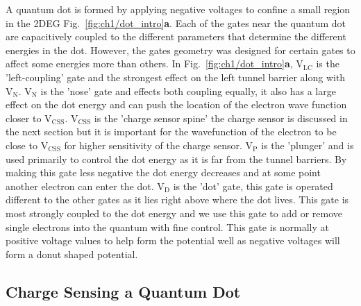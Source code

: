 A quantum dot is formed by applying negative voltages to confine a small region in the 2DEG Fig.~\ref{fig:ch1/dot_intro}\textbf{a}.
Each of the gates near the quantum dot are capacitively coupled to the different parameters that determine the different energies in the dot. However, the gates geometry was designed for certain gates to affect some energies more than others. In Fig.~\ref{fig:ch1/dot_intro}\textbf{a}, $\mathrm{V_{LC}}$ is the 'left-coupling' gate and the strongest effect on the left tunnel barrier along with $\mathrm{V_{N}}$. $\mathrm{V_{N}}$ is the 'nose' gate and effects both coupling equally, it also has a large effect on the dot energy and can push the location of the electron wave function closer to $\mathrm{V_{CSS}}$. $\mathrm{V_{CSS}}$ is the 'charge sensor spine' the charge sensor is discussed in the next section but it is important for the wavefunction of the electron to be close to $\mathrm{V_{CSS}}$ for higher sensitivity of the charge sensor. $\mathrm{V_{P}}$ is the 'plunger' and is used primarily to control the dot energy as it is far from the tunnel barriers. By making this gate less negative the dot energy decreases and at some point another electron can enter the dot. $\mathrm{V_{D}}$ is the 'dot' gate, this gate is operated different to the other gates as it lies right above where the dot lives. This gate is most strongly coupled to the dot energy and we use this gate to add or remove single electrons into the quantum with fine control. This gate is normally at positive voltage values to help form the potential well as negative voltages will form a donut shaped potential. 



\afterpage{\clearpage}
\subsection{Charge Sensing a Quantum Dot}

